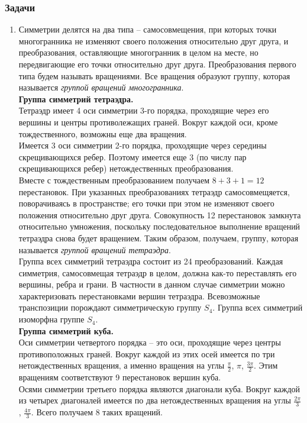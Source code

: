 \documentclass[12pt]{article}
\begin{document}
\subsubsection{Задачи}
\begin{enumerate}
    \item
    Симметрии делятся на два типа -- самосовмещения, при которых точки многогранника не изменяют своего положения относительно друг друга, и преобразования, оставляющие многогранник в целом на месте, но передвигающие его точки относительно друг друга. Преобразования первого типа будем называть вращениями. Все вращения образуют группу, которая называется \textit{группой вращений многогранника}.\\
    \textbf{Группа симметрий тетраэдра.}\\
    Тетраэдр имеет 4 оси симметрии 3-го порядка, проходящие через его вершины и центры противолежащих граней. Вокруг каждой оси, кроме тождественного, возможны еще два вращения.\\
    Имеется 3 оси симметрии 2-го порядка, проходящие через середины скрещивающихся ребер. Поэтому имеется еще 3 (по числу пар скрещивающихся ребер) нетождественных преобразования.\\
    Вместе с тождественным преобразованием получаем $8+3+1=12$ перестановок. При указанных преобразованиях тетраэдр самосовмещяется, поворачиваясь в пространстве; его точки при этом не изменяют своего положения относительно друг друга. Совокупность 12 перестановок замкнута относительно умножения, поскольку последовательное выполнение вращений тетраэдра снова будет вращением. Таким образом, получаем, группу, которая называется \textit{группой вращений тетраэдра}.\\
    Группа всех симметрий тетраэдра состоит из 24 преобразований. Каждая симметрия, самосовмещая тетраэдр в целом, должна как-то переставлять его вершины, ребра и грани. В частности в данном случае симметрии можно характеризовать перестановками вершин тетраэдра. Всевозможные транспозиции порождают симметрическую группу $S_4$. Группа всех симметрий изоморфна группе $S_4$.\\
    \textbf{Группа симметрий куба.}\\
    Оси симметрии четвертого порядка -- это оси, проходящие через центры противоположных граней. Вокруг каждой из этих осей имеется по три нетождественных вращения, а именно вращения на углы $\frac{\pi}{2}$, $\pi$, $\frac{3\pi}{2}$. Этим вращениям соответствуют 9 перестановок вершин куба.\\
    Осями симметрии третьего порядка являются диагонали куба. Вокруг каждой из четырех диагоналей имеется по два нетождественных вращения на углы $\frac{2\pi}{3}$, $\frac{4\pi}{3}$. Всего получаем 8 таких вращений.\\

\end{enumerate}
\end{document}
